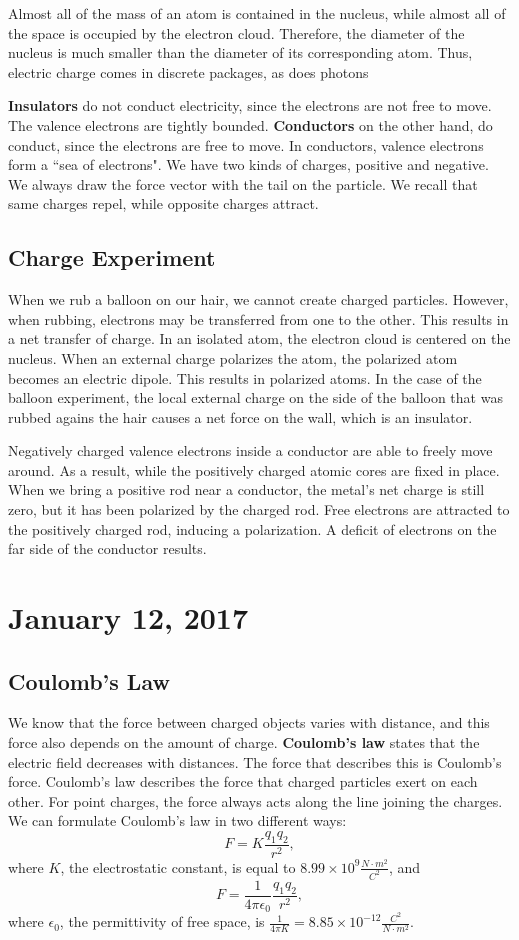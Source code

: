 \documentclass[11pt]{article}
\theoremstyle{plain} %
\theoremstyle{definition}
\theoremstyle{example}
\theoremstyle{remark}
\begin{document}
Almost all of the mass of an atom is contained in the nucleus, while almost all of the space is occupied by the electron cloud. Therefore, the diameter of the nucleus is much smaller than the diameter of its corresponding atom. Thus, electric charge comes in discrete packages, as does photons

\textbf{Insulators} do not conduct electricity, since the electrons are not free to move. The valence electrons are tightly bounded. \textbf{Conductors} on the other hand, do conduct, since the electrons are free to move. In conductors, valence electrons form a ``sea of electrons". We have two kinds of charges, positive and negative. We always draw the force vector with the tail on the particle. We recall that same charges repel, while opposite charges attract. 

\subsection{Charge Experiment}

When we rub a balloon on our hair, we cannot create charged particles. However, when rubbing, electrons may be transferred from one to the other. This results in a net transfer of charge. In an isolated atom, the electron cloud is centered on the nucleus. When an external charge polarizes the atom, the polarized atom becomes an electric dipole. This results in polarized atoms. In the case of the balloon experiment, the local external charge on the side of the balloon that was rubbed agains the hair causes a net force on the wall, which is an insulator. 

Negatively charged valence electrons inside a conductor are able to freely move around. As a result, while the positively charged atomic cores are fixed in place. When we bring a positive rod near a conductor, the metal's net charge is still zero, but it has been polarized by the charged rod. Free electrons are attracted to the positively charged rod, inducing a polarization. A deficit of electrons on the far side of the conductor results.

\section{January 12, 2017}
\subsection{Coulomb's Law}

We know that the force between charged objects varies with distance, and this force also depends on the amount of charge. \textbf{Coulomb's law} states that the electric field decreases with distances. The force that describes this is Coulomb's force. Coulomb's law describes the force that charged particles exert on each other. For point charges, the force always acts along the line joining the charges. We can formulate Coulomb's law in two different ways:
$$F = K\frac{q_1q_2}{r^2},$$
where $K$, the electrostatic constant, is equal to $8.99 \times 10^9\frac{N\cdot m^2}{C^2}$,  and
$$F = \frac{1}{4 \pi \epsilon_0}\frac{q_1q_2}{r^2},$$
where $\epsilon_0$, the permittivity of free space, is $\frac{1}{4 \pi K} = 8.85\times10^{-12}\frac{C^2}{N\cdot m^2}$. 
\end{document}
